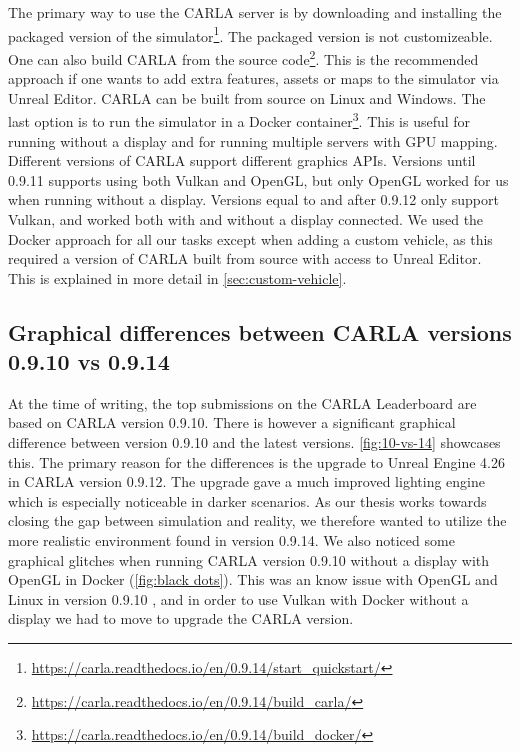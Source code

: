 The primary way to use the CARLA server is by downloading and installing the packaged version of the simulator\footnote{\url{https://carla.readthedocs.io/en/0.9.14/start_quickstart/}}. The packaged version is not customizeable. One can also build CARLA from the source code\footnote{\url{https://carla.readthedocs.io/en/0.9.14/build_carla/}}. This is the recommended approach if one wants to add extra features, assets or maps to the simulator via Unreal Editor. CARLA can be built from source on Linux and Windows. The last option is to run the simulator in a Docker container\footnote{\url{https://carla.readthedocs.io/en/0.9.14/build_docker/}}. This is useful for running without a display and for running multiple servers with GPU mapping. Different versions of CARLA support different graphics APIs. Versions until 0.9.11 supports using both Vulkan and OpenGL, but only OpenGL worked for us when running without a display. Versions equal to and after 0.9.12 only support Vulkan, and worked both with and without a display connected. We used the Docker approach for all our tasks except when adding a custom vehicle, as this required a version of CARLA built from source with access to Unreal Editor. This is explained in more detail in \cref{sec:custom-vehicle}.

\subsection{Graphical differences between CARLA versions 0.9.10 vs 0.9.14}
At the time of writing, the top submissions on the CARLA Leaderboard are based on CARLA version 0.9.10. There is however a significant graphical difference between version 0.9.10 and the latest versions. \cref{fig:10-vs-14} showcases this. The primary reason for the differences is the upgrade to Unreal Engine 4.26 in CARLA version 0.9.12. The upgrade gave a much improved lighting engine which is especially noticeable in darker scenarios. 
 As our thesis works towards closing the gap between simulation and reality, we therefore wanted to utilize the more realistic environment found in version 0.9.14. We also noticed some graphical glitches when running CARLA version 0.9.10 without a display with OpenGL in Docker (\cref{fig:black dots}). This was an know issue with OpenGL and Linux in version 0.9.10 \cite{github-rendering-issues-0.9.10}, and in order to use Vulkan with Docker without a display we had to move to upgrade the CARLA version.

